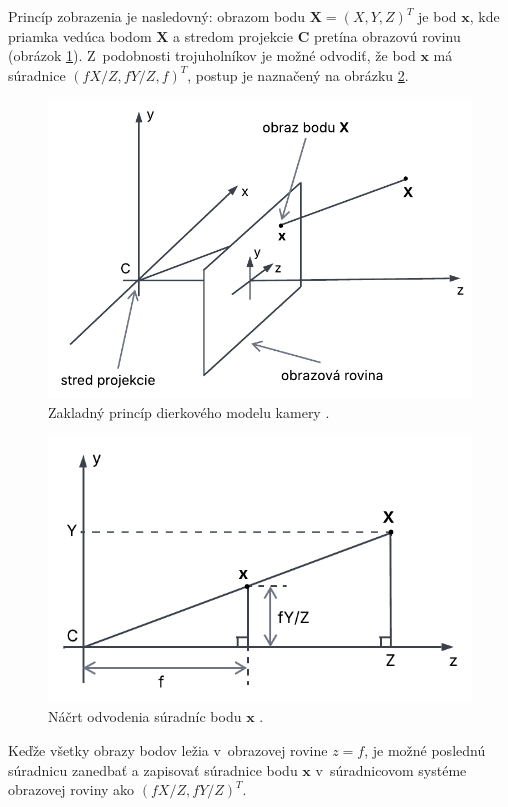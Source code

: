 Princíp zobrazenia je nasledovný: obrazom bodu $\mathbf{X} = (X, Y, Z)^T$ je bod $\mathbf{x}$, kde priamka vedúca bodom $\mathbf{X}$ a stredom projekcie $\mathbf{C}$ pretína obrazovú rovinu (obrázok \ref{fig:model_kamery1}). Z~podobnosti trojuholníkov je možné odvodiť, že bod $\mathbf{x}$ má súradnice $(fX/Z, fY/Z, f)^T$, postup je naznačený na obrázku \ref{fig:model_kamery2}.

\begin{figure}[h!]
    \centering
    \includegraphics[width=0.7\linewidth]{text_prace/obrazky-figures/model_kamery1.pdf}
    \caption[Zakladný princíp dierkového modelu kamery.]{Zakladný princíp dierkového modelu kamery \cite{multiple_view_geometry}.}
    \label{fig:model_kamery1}
\end{figure}

\begin{figure}[h!]
    \centering
    \includegraphics[width=0.7\linewidth]{text_prace/obrazky-figures/model_kamery2.pdf}
    \caption[Náčrt odvodenia súradníc zobrazovaného bodu u~dierkového modelu kamery.]{Náčrt odvodenia súradníc bodu $\mathbf{x}$ \cite{multiple_view_geometry}.}
    \label{fig:model_kamery2}
\end{figure}

Keďže všetky obrazy bodov ležia v~obrazovej rovine $z = f$, je možné poslednú súradnicu zanedbať a zapisovať súradnice bodu $\mathbf{x}$ v~súradnicovom systéme obrazovej roviny ako $(fX/Z, fY/Z)^T$.


